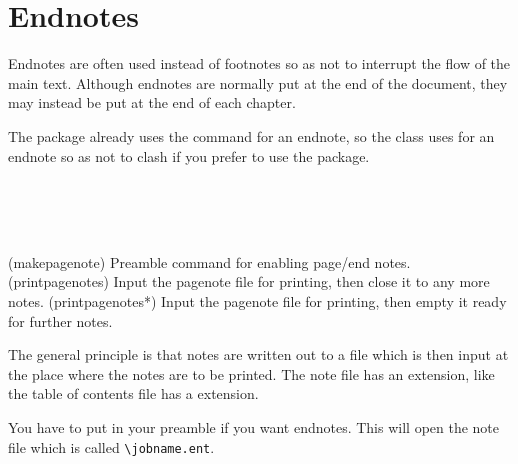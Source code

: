 
\section{Endnotes}
\label{sec:endnotes}




    Endnotes are often used instead of footnotes so as not to interrupt the
flow of the main text. Although endnotes are normally put at the end of 
the document, they may instead be put at the end of each chapter.

    The  package already uses the command \cmd{\endnote} for
an endnote, so the class uses \cmd{\pagenote} for an endnote so as not 
to clash if you prefer to use the package. 

\begin{syntax}
\cmd{\makepagenote} \\
\cmd{\pagenote} \\
\cmd{\printpagenotes} \cmd{\printpagenotes*} \\
\end{syntax}
\glossary(makepagenote)%
  {}%
  {Preamble command for enabling page/end notes.}%
\glossary(printpagenotes)%
  {}%
  {Input the pagenote  file for printing, then close it to any 
   more notes.}%
\glossary(printpagenotes*)%
  {}%
  {Input the pagenote  file for printing, then empty it ready for 
   further notes.}%

   The general principle is that notes are written out to a file which
is then input at the place where the notes are to be printed. The note 
file has an  extension, like the table of contents file
has a  extension.

    You have to put \cmd{\makepagenote} in your preamble if you want 
endnotes. This will open the  note file which is called
\verb?\jobname.ent?.

